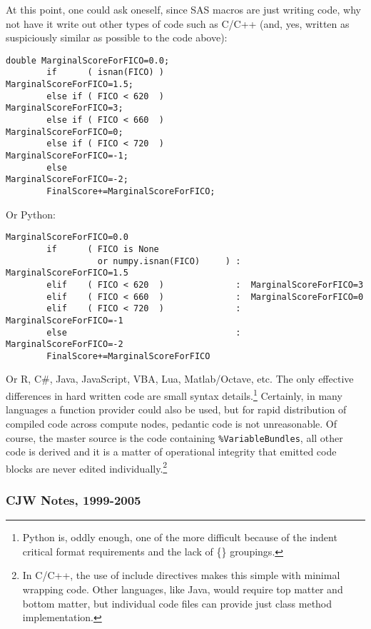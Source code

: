 \documentclass[10pt]{article}
\begin{document}
At this point, one could ask oneself, since SAS macros are just writing code, why not have it write out other types of code
such as C/C++ (and, yes, written as suspiciously similar as possible to the code above):
\begin{Verbatim}[fontsize=\small,baselinestretch=0.75,formatcom=\color{red}]
        double MarginalScoreForFICO=0.0;
        if      ( isnan(FICO) )                 MarginalScoreForFICO=1.5;
        else if ( FICO < 620  )                 MarginalScoreForFICO=3;
        else if ( FICO < 660  )                 MarginalScoreForFICO=0;
        else if ( FICO < 720  )                 MarginalScoreForFICO=-1;
        else                                    MarginalScoreForFICO=-2;
        FinalScore+=MarginalScoreForFICO;
\end{Verbatim}
Or Python:
\begin{Verbatim}[fontsize=\small,baselinestretch=0.75,formatcom=\color{red}]
        MarginalScoreForFICO=0.0
        if      ( FICO is None 
                  or numpy.isnan(FICO)     ) :  MarginalScoreForFICO=1.5
        elif    ( FICO < 620  )              :  MarginalScoreForFICO=3
        elif    ( FICO < 660  )              :  MarginalScoreForFICO=0
        elif    ( FICO < 720  )              :  MarginalScoreForFICO=-1
        else                                 :  MarginalScoreForFICO=-2
        FinalScore+=MarginalScoreForFICO
\end{Verbatim}
Or R, C\#, Java, JavaScript, VBA, Lua, Matlab/Octave, etc.  The only effective differences in hard written code are small syntax
details.\footnote{ Python  is, oddly enough, one of the more difficult because of the indent critical format requirements and the lack of
\{\} groupings.  } Certainly, in many languages a function provider could also be used, but for rapid distribution of compiled code across
compute nodes, pedantic code is not unreasonable.  Of course, the master source is the code containing \verb+%VariableBundles+, all other
code is derived and it is a matter of operational integrity that emitted code blocks are never edited individually.\footnote{In C/C++, the
use of include directives makes this simple with minimal wrapping code.  Other languages, like Java, would require top matter and bottom
matter, but individual code files can provide just class method implementation.}

\ifcommentary

\subsubsection{CJW Notes, 1999-2005}
\end{document}
